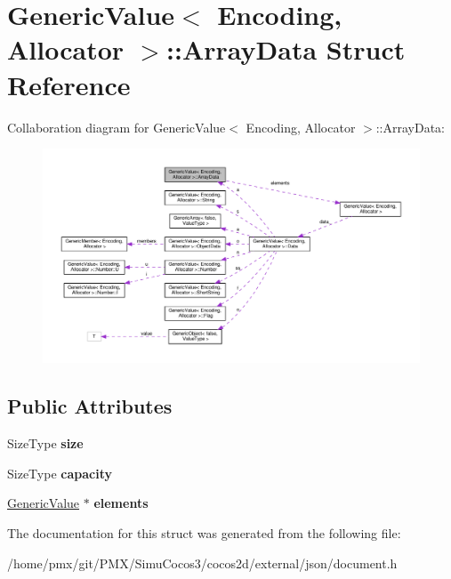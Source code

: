 \hypertarget{structGenericValue_1_1ArrayData}{}\section{Generic\+Value$<$ Encoding, Allocator $>$\+:\+:Array\+Data Struct Reference}
\label{structGenericValue_1_1ArrayData}


Collaboration diagram for Generic\+Value$<$ Encoding, Allocator $>$\+:\+:Array\+Data\+:
\nopagebreak
\begin{figure}[H]
\begin{center}
\leavevmode
\includegraphics[width=350pt]{structGenericValue_1_1ArrayData__coll__graph}
\end{center}
\end{figure}
\subsection*{Public Attributes}
\begin{DoxyCompactItemize}
\item 
\mbox{\label{structGenericValue_1_1ArrayData_a5306856f64aea8ec53abf263ed2a35e2}} 
Size\+Type {\bfseries size}
\item 
\mbox{\label{structGenericValue_1_1ArrayData_a0c6fe03c00e13d14b95abd31048aa1f5}} 
Size\+Type {\bfseries capacity}
\item 
\mbox{\label{structGenericValue_1_1ArrayData_a86df976cb6f65924aca20eb9bd35553e}} 
\hyperlink{classGenericValue}{Generic\+Value} $\ast$ {\bfseries elements}
\end{DoxyCompactItemize}


The documentation for this struct was generated from the following file\+:\begin{DoxyCompactItemize}
\item 
/home/pmx/git/\+P\+M\+X/\+Simu\+Cocos3/cocos2d/external/json/document.\+h\end{DoxyCompactItemize}
